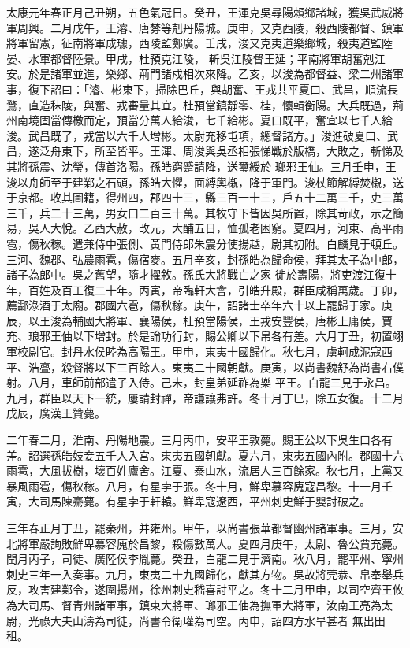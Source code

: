 \begin{pinyinscope}
 太康元年春正月己丑朔，五色氣冠日。癸丑，王渾克吳尋陽賴鄉諸城，獲吳武威將軍周興。二月戊午，王濬、唐棼等剋丹陽城。庚申，又克西陵，殺西陵都督、鎮軍將軍留憲，征南將軍成璩，西陵監鄭廣。壬戌，浚又克夷道樂鄉城，殺夷道監陸晏、水軍都督陸景。甲戌，杜預克江陵，
 斬吳江陵督王延；平南將軍胡奮剋江安。於是諸軍並進，樂鄉、荊門諸戍相次來降。乙亥，以浚為都督益、梁二州諸軍事，復下詔曰：「濬、彬東下，掃除巴丘，與胡奮、王戎共平夏口、武昌，順流長鶩，直造秣陵，與奮、戎審量其宜。杜預當鎮靜零、桂，懷輯衡陽。大兵既過，荊州南境固當傳檄而定，預當分萬人給浚，七千給彬。夏口既平，奮宜以七千人給浚。武昌既了，戎當以六千人增彬。太尉充移屯項，總督諸方。」浚進破夏口、武昌，遂泛舟東下，所至皆平。王渾、周浚與吳丞相張悌戰於版橋，大敗之，斬悌及其將孫震、沈瑩，傳首洛陽。孫皓窮蹙請降，送璽綬於
 瑯邪王伷。三月壬申，王浚以舟師至于建鄴之石頭，孫皓大懼，面縛輿櫬，降于軍門。浚杖節解縛焚櫬，送于京都。收其圖籍，得州四，郡四十三，縣三百一十三，戶五十二萬三千，吏三萬三千，兵二十三萬，男女口二百三十萬。其牧守下皆因吳所置，除其苛政，示之簡易，吳人大悅。乙酉大赦，改元，大酺五日，恤孤老困窮。夏四月，河東、高平雨雹，傷秋稼。遣兼侍中張側、黃門侍郎朱震分使揚越，尉其初附。白麟見于頓丘。三河、魏郡、弘農雨雹，傷宿麥。五月辛亥，封孫皓為歸命侯，拜其太子為中郎，諸子為郎中。吳之舊望，隨才擢敘。孫氏大將戰亡之家
 徙於壽陽，將吏渡江復十年，百姓及百工復二十年。丙寅，帝臨軒大會，引皓升殿，群臣咸稱萬歲。丁卯，薦酃淥酒于太廟。郡國六雹，傷秋稼。庚午，詔諸士卒年六十以上罷歸于家。庚辰，以王浚為輔國大將軍、襄陽侯，杜預當陽侯，王戎安豐侯，唐彬上庸侯，賈充、琅邪王伷以下增封。於是論功行封，賜公卿以下帛各有差。六月丁丑，初置翊軍校尉官。封丹水侯睦為高陽王。甲申，東夷十國歸化。秋七月，虜軻成泥寇西平、浩亹，殺督將以下三百餘人。東夷二十國朝獻。庚寅，以尚書魏舒為尚書右僕射。八月，車師前部遣子入侍。己未，封皇弟延祚為樂
 平王。白龍三見于永昌。九月，群臣以天下一統，屢請封禪，帝謙讓弗許。冬十月丁巳，除五女復。十二月戊辰，廣漢王贊薨。



 二年春二月，淮南、丹陽地震。三月丙申，安平王敦薨。賜王公以下吳生口各有差。詔選孫皓妓妾五千人入宮。東夷五國朝獻。夏六月，東夷五國內附。郡國十六雨雹，大風拔樹，壞百姓廬舍。江夏、泰山水，流居人三百餘家。秋七月，上黨又暴風雨雹，傷秋稼。八月，有星孛于張。冬十月，鮮卑慕容廆寇昌黎。十一月壬寅，大司馬陳騫薨。有星孛于軒轅。鮮卑寇遼西，平州刺史鮮于嬰討破之。



 三年春正月丁丑，罷秦州，并雍州。甲午，以尚書張華都督幽州諸軍事。三月，安北將軍嚴詢敗鮮卑慕容廆於昌黎，殺傷數萬人。夏四月庚午，太尉、魯公賈充薨。閏月丙子，司徒、廣陸侯李胤薨。癸丑，白龍二見于濟南。秋八月，罷平州、寧州刺史三年一入奏事。九月，東夷二十九國歸化，獻其方物。吳故將莞恭、帛奉舉兵反，攻害建鄴令，遂圍揚州，徐州刺史嵇喜討平之。冬十二月甲申，以司空齊王攸為大司馬、督青州諸軍事，鎮東大將軍、瑯邪王伷為撫軍大將軍，汝南王亮為太尉，光祿大夫山濤為司徒，尚書令衛瓘為司空。丙申，詔四方水旱甚者
 無出田租。




\end{pinyinscope}
